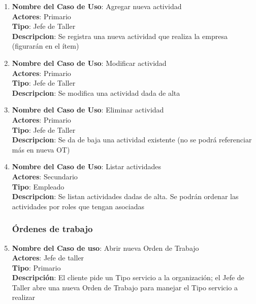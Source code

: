 \documentclass[12pt]{extarticle}
\begin{document}
\begin{spacing}{1.2}
\begin{enumerate}
        \item 	\textbf{Nombre del Caso de Uso}: Agregar nueva actividad\\
                \textbf{Actores}: Primario\\
                \textbf{Tipo}: Jefe de Taller\\
                \textbf{Descripcion}: Se registra una nueva actividad que realiza la empresa (figurarán en el ítem)

        \item 	\textbf{Nombre del Caso de Uso}: Modificar actividad\\
                \textbf{Actores}: Primario\\
                \textbf{Tipo}: Jefe de Taller\\
                \textbf{Descripcion}: Se modifica una actividad dada de alta

        \item 	\textbf{Nombre del Caso de Uso}: Eliminar actividad\\
                \textbf{Actores}: Primario\\
                \textbf{Tipo}: Jefe de Taller\\
                \textbf{Descripcion}: Se da de baja una actividad existente (no se podrá referenciar más en nueva OT)

        \item 	\textbf{Nombre del Caso de Uso}: Listar actividades\\
                \textbf{Actores}: Secundario\\
                \textbf{Tipo}: Empleado\\
                \textbf{Descripcion}: Se listan actividades dadas de alta. Se podrán ordenar las actividades por roles que tengan asociadas



        \subsubsection{Órdenes de trabajo}



        \item 	\textbf{Nombre del Caso de uso}: Abrir nueva Orden de Trabajo\\
                \textbf{Actores}: Jefe de taller\\
                \textbf{Tipo}: Primario\\
                \textbf{Descripción}: El cliente pide un Tipo servicio a la organización; el Jefe de Taller abre una nueva Orden de Trabajo para manejar el Tipo servicio a realizar


\end{enumerate}
\end{spacing}
\end{document}
